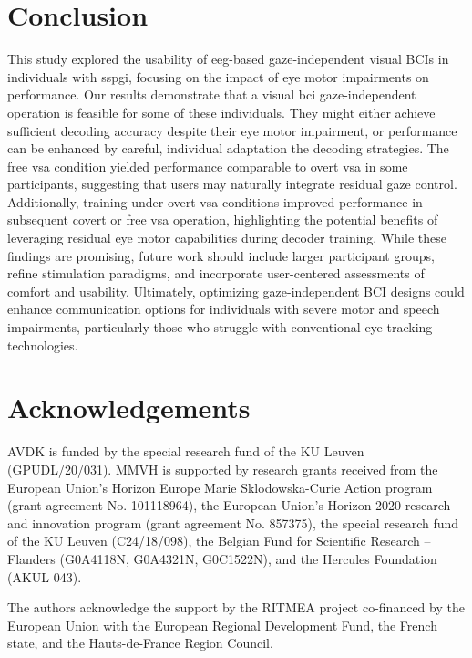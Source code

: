 \documentclass[twocolumn]{article}
\begin{document}
\section{Conclusion}
This study explored the usability of \ac{eeg}-based gaze-independent visual BCIs in
individuals with \ac{sspgi}, focusing on the impact of eye motor impairments
on performance.
Our results demonstrate that a visual \ac{bci} gaze-independent operation is feasible
for some of these individuals.
They might either achieve sufficient decoding accuracy despite their eye
motor impairment, or performance can be enhanced by careful, individual
adaptation the decoding strategies.
The free \ac{vsa} condition yielded performance comparable to overt \ac{vsa} in some participants, suggesting that users may naturally integrate residual gaze control.
Additionally, training under overt \ac{vsa} conditions improved performance in
subsequent covert or free \ac{vsa} operation, highlighting the potential benefits of
leveraging residual eye motor capabilities during decoder training.
While these findings are promising, future work should include larger
participant groups, refine stimulation paradigms, and incorporate
user-centered assessments of comfort and usability.
Ultimately, optimizing gaze-independent BCI designs could enhance communication
options for individuals with severe motor and speech impairments, particularly
those who struggle with conventional eye-tracking technologies.


\section*{Acknowledgements}
AVDK is funded by the special research fund of the KU Leuven (GPUDL/20/031).
MMVH is supported by research grants received from the European Union’s
Horizon Europe Marie Sklodowska-Curie Action program
(grant agreement No. 101118964), the European Union’s Horizon 2020 research and
innovation program (grant agreement No. 857375), the special research fund of
the KU Leuven (C24/18/098), the Belgian Fund for Scientific Research – Flanders
(G0A4118N, G0A4321N, G0C1522N), and the Hercules Foundation (AKUL 043).

The authors acknowledge the support by the RITMEA project co-financed by the
European Union with the European Regional Development Fund, the French state,
and the Hauts-de-France Region Council.
\printbibliography
\end{document}

